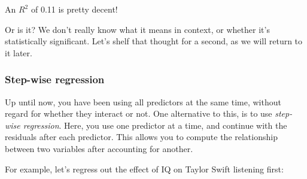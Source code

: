 \documentclass[11pt]{article}
\begin{document}
    An \(R^{2}\) of 0.11 is pretty decent!

Or is it? We don't really know what it means in context, or whether it's
statistically significant. Let's shelf that thought for a second, as we
will return to it later.

    \subsubsection{Step-wise regression}\label{step-wise-regression}

Up until now, you have been using all predictors at the same time,
without regard for whether they interact or not. One alternative to
this, is to use \emph{step-wise regression}. Here, you use one predictor
at a time, and continue with the residuals after each predictor. This
allows you to compute the relationship between two variables after
accounting for another.

For example, let's regress out the effect of IQ on Taylor Swift
listening first:
\end{document}
